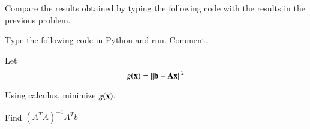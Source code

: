 \begin{problem}
	Compare the results obtained by typing the following code with the results in the previous problem.




%
%
%
%
%
%
%
%
\end{problem}
%
\begin{problem}
	Type the following code in Python and run.  Comment.
\end{problem}
%

	Let 
	\begin{equation}
	g(\mathbf{x}) = \lVert\mathbf{b} -\mathbf{Ax}\rVert^2
	\end{equation}
	
%
\begin{problem}
		Using calculus, minimize $g(\mathbf{x})$.
\end{problem}
%
\begin{problem}
Find $(A^TA)^{-1}A^Tb$
\end{problem}

